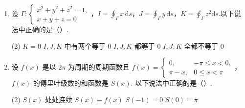 \documentclass[../main.tex]{subfiles}
\begin{document}
\begin{enumerate}
          \begin{tasks}[label=\textbf{\Alph*.}, label-width=1.5em, column-sep=1em](1)
              \task \( \displaystyle \int_0^2 \mathrm{d}x \displaystyle \int_0^{1 + \sqrt{1 - x^2}} f(x, y) \mathrm{d}y \)
              \task \( \displaystyle \int_0^2 \mathrm{d}x \displaystyle \int_0^{\sqrt{2x - x^2}} f(x, y) \mathrm{d}y \)
              \task \( \displaystyle \int_0^2 \mathrm{d}y \displaystyle \int_0^{\sqrt{2y - y^2}} f(x, y) \mathrm{d}x \)
              \task \( \displaystyle \int_0^2 \mathrm{d}x \displaystyle \int_0^2 f(x, y) \mathrm{d}y \)
          \end{tasks}

    \item 设 \( \Gamma: \begin{cases} x^2 + y^2 + z^2 = 1, \\ x + y + z = 0 \end{cases} \)，\( I = \displaystyle \oint_{\Gamma} x\,\mathrm{d}s \)，\( J = \displaystyle \oint_{\Gamma} y\,\mathrm{d}s \)，\( K = \displaystyle \oint_{\Gamma} z^2 \mathrm{d}s \).以下说法中正确的是（\qquad）.

          \begin{tasks}[label=\textbf{\Alph*.}, label-width=1.5em, column-sep=1em](2)
              \task \( K = 0 \)
              \task \( I, J, K \) 中有两个等于 0
              \task \( I, J, K \) 都等于 0
              \task \( I, J, K \) 全都不等于 0
          \end{tasks}

    \item 设 \( f(x) \) 是以 \( 2\pi \) 为周期的周期函数且 \( f(x) = \begin{cases} 0, & -\pi \leq x < 0, \\ \pi - x, & 0 \leq x < \pi \end{cases} \)，\( f(x) \) 的傅里叶级数的和函数是 \( S(x) \). 以下说法中正确的是（\qquad）.

          \begin{tasks}[label=\textbf{\Alph*.}, label-width=1.5em, column-sep=1em](2)
              \task \( S(x) \) 处处连续
              \task \( S(x) \equiv f(x) \)
              \task \( S(-1) = 0 \)
              \task \( S(0) = \pi \)
          \end{tasks}
\end{enumerate}
\end{document}
